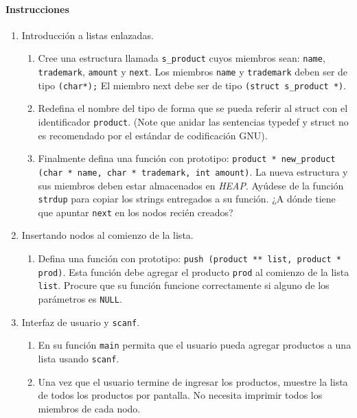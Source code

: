 \documentclass[letterpaper,10pt]{article}
\begin{document}
\paragraph{Instrucciones}
\begin{enumerate}
  \item Introducción a listas enlazadas.
  \begin{enumerate}
    \item Cree una estructura llamada \texttt{s\_product} cuyos miembros sean: \texttt{name}, \texttt{trademark}, \texttt{amount} y \texttt{next}.
	  Los miembros \texttt{name} y \texttt{trademark} deben ser de tipo \texttt{(char*);} El miembro next debe ser de tipo \texttt{(struct s\_product *)}. 
    \item Redefina el nombre del tipo de forma que se pueda referir al struct con el identificador \texttt{product}. (Note que anidar las sentencias typedef y struct no es recomendado por el estándar de codificación GNU). 
    \item Finalmente defina una función con prototipo: \texttt{product * new\_product (char * name, char * trademark, int amount)}. La nueva
	  estructura y sus miembros deben estar almacenados en \textit{HEAP}. Ayúdese de la función \texttt{strdup} para copiar los strings entregados
	  a su función. ¿A dónde tiene que apuntar \texttt{next} en los nodos recién creados?
  \end{enumerate}

  \item Insertando nodos al comienzo de la lista.
  \begin{enumerate}
    \item Defina una función con prototipo: \texttt{push (product ** list, product * prod)}. Esta función debe agregar el producto \texttt{prod}
	  al comienzo de la lista \texttt{list}. Procure que su función funcione correctamente si alguno de los parámetros es \texttt{NULL}.
  \end{enumerate}

  \item Interfaz de usuario y \texttt{scanf}.
  \begin{enumerate}
    \item En su función \texttt{main} permita que el usuario pueda agregar productos a una lista usando \texttt{scanf}.
    \item Una vez que el usuario termine de ingresar los productos, muestre la lista de todos los productos por pantalla. No necesita imprimir
	  todos los miembros de cada nodo.
  \end{enumerate}


\end{enumerate}
\end{document}
